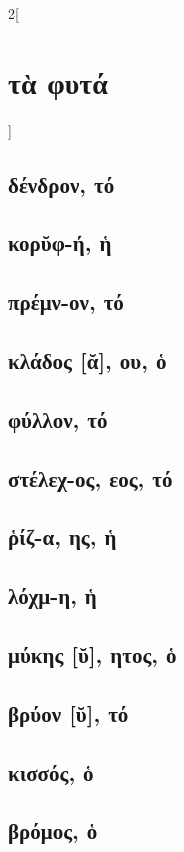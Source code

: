\documentclass{book}
\begin{document}
\newpage  
\begin{multicols}{2}[\section{τὰ φυτά}]
\subsection{δένδρον, τό}
\subsection{κορῠφ-ή, ἡ}
\subsection{πρέμν-ον, τό}
\subsection{κλάδος [ᾰ], ου, ὁ}
\subsection{φύλλον, τό}
\subsection{στέλεχ-ος, εος, τό}
\subsection{ῥίζ-α, ης, ἡ}
\subsection{λόχμ-η, ἡ}
\subsection{μύκης [ῠ], ητος, ὁ}
\subsection{βρύον [ῠ], τό}
\subsection{κισσός, ὁ}
\subsection{βρόμος, ὁ}

\end{multicols}
\end{document}
